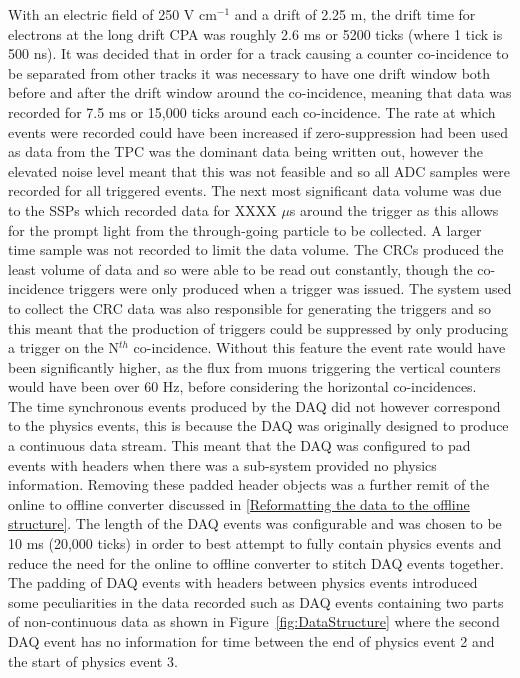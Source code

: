 With an electric field of 250 V cm$^{-1}$ and a drift of 2.25 m, the drift time for electrons at the long drift CPA was roughly 2.6 ms or 5200 ticks (where 1 tick is 500 ns). It was decided that in order for a track causing a counter co-incidence to be separated from other tracks it was necessary to have one drift window both before and after the drift window around the co-incidence, meaning that data was recorded for 7.5 ms or 15,000 ticks around each co-incidence. The rate at which events were recorded could have been increased if zero-suppression had been used as data from the TPC was the dominant data being written out, however the elevated noise level meant that this was not feasible and so all ADC samples were recorded for all triggered events. The next most significant data volume was due to the SSPs which recorded data for XXXX $\mu$s around the trigger as this allows for the prompt light from the through-going particle to be collected. A larger time sample was not recorded to limit the data volume. The CRCs produced the least volume of data and so were able to be read out constantly, though the co-incidence triggers were only produced when a trigger was issued. The system used to collect the CRC data was also responsible for generating the triggers and so this meant that the production of triggers could be suppressed by only producing a trigger on the N$^{th}$ co-incidence. Without this feature the event rate would have been significantly higher, as the flux from muons triggering the vertical counters would have been over 60 Hz, before considering the horizontal co-incidences. \\

The time synchronous events produced by the DAQ did not however correspond to the physics events, this is because the DAQ was originally designed to produce a continuous data stream. This meant that the DAQ was configured to pad events with headers when there was a sub-system provided no physics information. Removing these padded header objects was a further remit of the online to offline converter discussed in \ref{Reformatting the data to the offline structure}. The length of the DAQ events was configurable and was chosen to be 10 ms (20,000 ticks) in order to best attempt to fully contain physics events and reduce the need for the online to offline converter to stitch DAQ events together. The padding of DAQ events with headers between physics events introduced some peculiarities in the data recorded such as DAQ events containing two parts of non-continuous data as shown in Figure~\ref{fig:DataStructure} where the second DAQ event has no information for time between the end of physics event 2 and the start of physics event 3.\\

